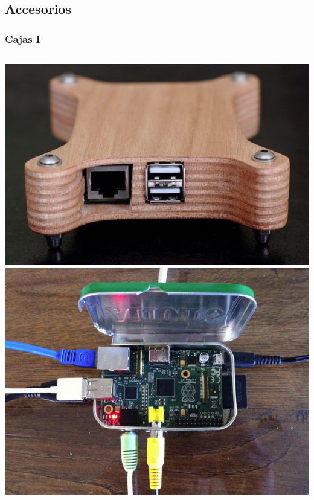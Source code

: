 \documentclass[10pt,colorlinks]{beamer}
\begin{document}
\subsection{Accesorios}

\begin{frame}[fragile]\frametitle{Cajas I}
\begin{columns}[c]
  \includegraphics[width=\textwidth]{figs/case3}
 \includegraphics[width=\textwidth]{figs/case4}
 \end{columns}
\end{frame}
 
\end{document}
